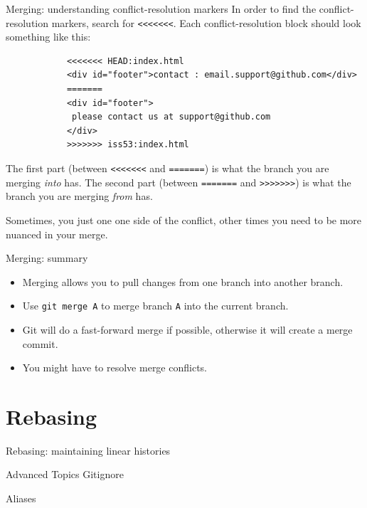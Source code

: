 \documentclass{beeper}
\begin{document}
\begin{frame}[fragile]{Merging: understanding conflict-resolution markers}
    In order to find the conflict-resolution markers, search for
    \texttt{<<<<<<<}. Each conflict-resolution block should look something like
    this:
    {
        \tiny
        \begin{verbatim}
            <<<<<<< HEAD:index.html
            <div id="footer">contact : email.support@github.com</div>
            =======
            <div id="footer">
             please contact us at support@github.com
            </div>
            >>>>>>> iss53:index.html
        \end{verbatim}
    }

    The first part (between \texttt{<<<<<<<} and \texttt{=======}) is what the
    branch you are merging \textit{into} has. The second part (between
    \texttt{=======} and \texttt{>>>>>>>}) is what the branch you are merging
    \textit{from} has.
    \pause

    Sometimes, you just one one side of the conflict, other times you need to be
    more nuanced in your merge.
\end{frame}

\begin{frame}{Merging: summary}
    \begin{itemize}
        \item Merging allows you to pull changes from one branch into another
            branch.
        \item Use \texttt{git merge A} to merge branch \texttt{A} into the
            current branch.
        \item Git will do a fast-forward merge if possible, otherwise it will
            create a merge commit.
        \item You might have to resolve merge conflicts.
    \end{itemize}
\end{frame}

\section{Rebasing}

\begin{frame}{Rebasing: maintaining linear histories}

\end{frame}

\begin{frame}{Advanced Topics}
    Gitignore

    Aliases
\end{frame}
\end{document}
